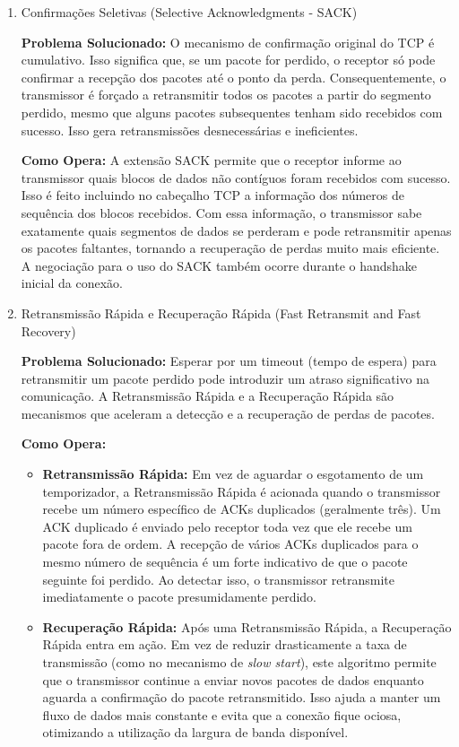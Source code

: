 \begin{enumerate}[label=\alph*.]
\begin{enumerate}[label=\roman*.]
\item{Confirmações Seletivas (Selective Acknowledgments - SACK)}

\textbf{Problema Solucionado:} O mecanismo de confirmação original do TCP é cumulativo. Isso significa que, se um pacote for perdido, o receptor só pode confirmar a recepção dos pacotes até o ponto da perda. Consequentemente, o transmissor é forçado a retransmitir todos os pacotes a partir do segmento perdido, mesmo que alguns pacotes subsequentes tenham sido recebidos com sucesso. Isso gera retransmissões desnecessárias e ineficientes.

\vspace{1em}

\textbf{Como Opera:} A extensão SACK permite que o receptor informe ao transmissor quais blocos de dados não contíguos foram recebidos com sucesso. Isso é feito incluindo no cabeçalho TCP a informação dos números de sequência dos blocos recebidos. Com essa informação, o transmissor sabe exatamente quais segmentos de dados se perderam e pode retransmitir apenas os pacotes faltantes, tornando a recuperação de perdas muito mais eficiente. A negociação para o uso do SACK também ocorre durante o handshake inicial da conexão.


\item{Retransmissão Rápida e Recuperação Rápida (Fast Retransmit and Fast Recovery)}

\textbf{Problema Solucionado:} Esperar por um timeout (tempo de espera) para retransmitir um pacote perdido pode introduzir um atraso significativo na comunicação. A Retransmissão Rápida e a Recuperação Rápida são mecanismos que aceleram a detecção e a recuperação de perdas de pacotes.

\vspace{1em}

\textbf{Como Opera:}
\begin{itemize}
    \item \textbf{Retransmissão Rápida:} Em vez de aguardar o esgotamento de um temporizador, a Retransmissão Rápida é acionada quando o transmissor recebe um número específico de ACKs duplicados (geralmente três). Um ACK duplicado é enviado pelo receptor toda vez que ele recebe um pacote fora de ordem. A recepção de vários ACKs duplicados para o mesmo número de sequência é um forte indicativo de que o pacote seguinte foi perdido. Ao detectar isso, o transmissor retransmite imediatamente o pacote presumidamente perdido.
    
    \item \textbf{Recuperação Rápida:} Após uma Retransmissão Rápida, a Recuperação Rápida entra em ação. Em vez de reduzir drasticamente a taxa de transmissão (como no mecanismo de \textit{slow start}), este algoritmo permite que o transmissor continue a enviar novos pacotes de dados enquanto aguarda a confirmação do pacote retransmitido. Isso ajuda a manter um fluxo de dados mais constante e evita que a conexão fique ociosa, otimizando a utilização da largura de banda disponível.
\end{itemize}
    \end{enumerate}



\end{enumerate}
